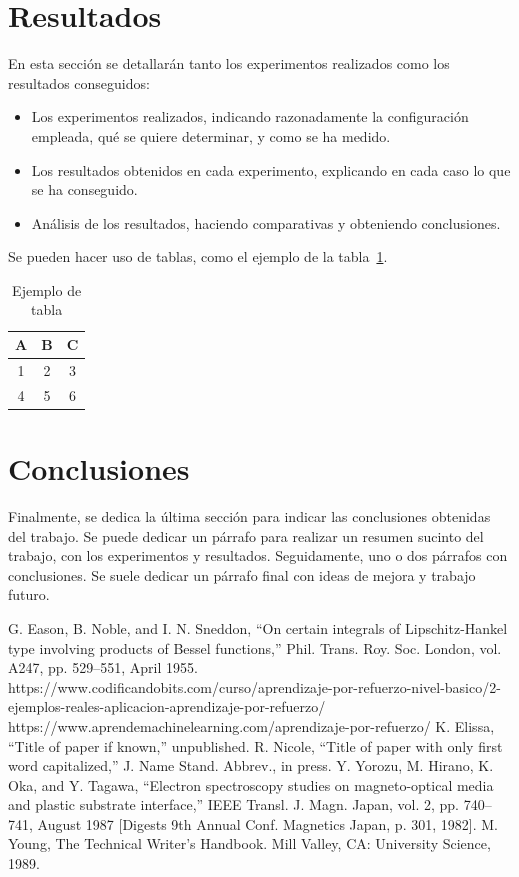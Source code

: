 \documentclass[conference,a4paper]{IEEEtran}
\begin{document}
\section{Resultados}

En esta sección se detallarán tanto los experimentos realizados como los
resultados conseguidos:
\begin{itemize}
\item Los experimentos realizados, indicando razonadamente la configuración
  empleada, qué se quiere determinar, y como se ha medido.
\item Los resultados obtenidos en cada experimento, explicando en cada caso lo
  que se ha conseguido.
\item Análisis de los resultados, haciendo comparativas y obteniendo
  conclusiones.
\end{itemize}

Se pueden hacer uso de tablas, como el ejemplo de la tabla~\ref{tab:ejemplo}.

\begin{table}
  \caption{Ejemplo de tabla}
  \label{tab:ejemplo}
  \centering
  \begin{tabular}{ccc}
    \toprule
    A & B & C \\
    \midrule
    1 & 2 & 3 \\
    4 & 5 & 6 \\
    \bottomrule
  \end{tabular}
\end{table}


\section{Conclusiones}

Finalmente, se dedica la última sección para indicar las conclusiones obtenidas
del trabajo. Se puede dedicar un párrafo para realizar un resumen sucinto del
trabajo, con los experimentos y resultados. Seguidamente, uno o dos párrafos
con conclusiones. Se suele dedicar un párrafo final con ideas de mejora y
trabajo futuro.


\begin{thebibliography}{00}
 G. Eason, B. Noble, and I. N. Sneddon, ``On certain integrals of Lipschitz-Hankel type involving products of Bessel functions,'' Phil. Trans. Roy. Soc. London, vol. A247, pp. 529--551, April 1955.
 https://www.codificandobits.com/curso/aprendizaje-por-refuerzo-nivel-basico/2-ejemplos-reales-aplicacion-aprendizaje-por-refuerzo/
 https://www.aprendemachinelearning.com/aprendizaje-por-refuerzo/
 K. Elissa, ``Title of paper if known,'' unpublished.
 R. Nicole, ``Title of paper with only first word capitalized,'' J. Name Stand. Abbrev., in press.
 Y. Yorozu, M. Hirano, K. Oka, and Y. Tagawa, ``Electron spectroscopy studies on magneto-optical media and plastic substrate interface,'' IEEE Transl. J. Magn. Japan, vol. 2, pp. 740--741, August 1987 [Digests 9th Annual Conf. Magnetics Japan, p. 301, 1982].
 M. Young, The Technical Writer's Handbook. Mill Valley, CA: University Science, 1989.
\end{thebibliography}
\end{document}
